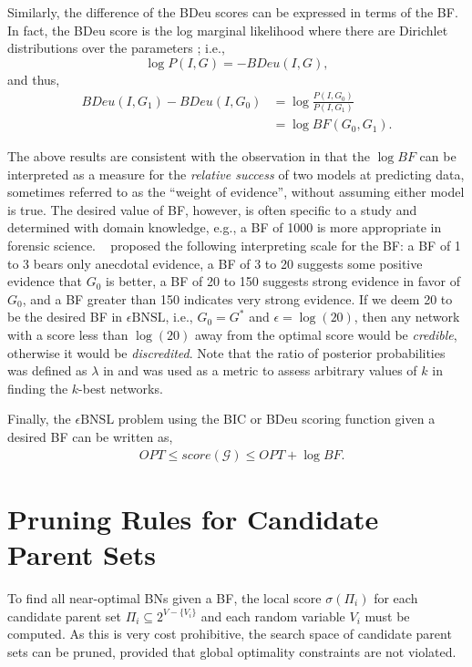\documentclass[letterpaper]{article}
\newcommand{\opt}{\mathit{OPT}}
\newcommand{\graph}{\mathit{G}}
\newcommand{\graphset}{\mathcal{G}}
\newcommand{\vertex}[1]{V_{#1}}
\newcommand{\vertices}{\mathit{V}}
\newcommand{\parents}{\Pi}
\newcommand{\cost}{\mathit{score}}
\newcommand{\problem}{\mathit{\epsilon}\text{BNSL}}
\newcommand{\varI}{I}
\begin{document}
Similarly, the difference of the BDeu scores can be expressed in terms of the BF. In fact, the BDeu score is the log marginal likelihood where there are Dirichlet distributions over the parameters \cite{Buntine91,HeckermanGC95}; i.e.,
$$
\log{P(\varI,\graph)}=-BDeu(\varI,\graph),
$$
and thus,
\begin{align*}
BDeu(\varI,\graph_1)-BDeu(\varI,\graph_0)&=\log{\frac{P(\varI,\graph_0)}{P(\varI,\graph_1)}}\\
&=\log{BF(\graph_0,\graph_1)}.
\end{align*}

The above results are consistent with the observation in \cite{kass1995bayes} that the $\log{BF}$ can be interpreted as a measure for the \emph{relative success} of two models at predicting data, sometimes referred to as the ``weight of evidence'', without assuming either model is true. The desired value of BF, however, is often specific to a study and determined with domain knowledge, e.g., a BF of 1000 is more appropriate in forensic science. \citeauthor{HeckermanGC95}~ proposed the following interpreting scale for the BF: a BF of 1 to 3 bears only anecdotal evidence, a BF of 3 to 20 suggests some positive evidence that $\graph_0$ is better, a BF of 20 to 150 suggests strong evidence in favor of $\graph_0$, and a BF greater than 150 indicates very strong evidence. If we deem 20 to be the desired BF in $\problem$, i.e., $\graph_0=\graph^*$ and $\epsilon=\log(20)$, then any network with a score less than $\log(20)$ away from the optimal score would be \emph{credible}, otherwise it would be \emph{discredited}. Note that the ratio of posterior probabilities was defined as $\lambda$ in \cite{TianHR10,ChenT2014} and was used as a metric to assess arbitrary values of $k$ in finding the $k$-best networks.

Finally, the $\problem$ problem using the BIC or BDeu scoring function given a desired BF can be written as,
\begin{align}\label{EQUATION:bf}
&\opt \le \cost(\graphset) \le \opt+\log{BF}.
\end{align}

\section{Pruning Rules for Candidate Parent Sets}\label{sec:pruning}

To find all near-optimal BNs given a BF, the local score $\sigma( \parents_{i} )$
for each candidate parent set
$\parents_{i} \subseteq 2^{\vertices - \{\vertex{i}\}}$
and each random variable $\vertex{i}$ must be computed. As this is very cost prohibitive, the search space of candidate parent sets can be pruned, provided that global optimality constraints are not violated.
\end{document}
